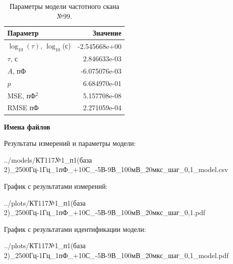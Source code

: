 \begin{table}[!ht]
    \centering
    \caption{Параметры модели частотного скана №99.}
    \begin{tabular}{|l|r|}
        \hline
        Параметр                                       & Значение                  \\ \hline
        $\log_{10}(\tau)$, $\log_{10}$(с)              & -2.545668e+00             \\ \hline
        $\tau$, с                                      & 2.846633e-03              \\ \hline
        $A$, пФ                                        & -6.075076e-03             \\ \hline
        $p$                                            & 6.684970e-01              \\ \hline
        MSE, пФ$^2$                                    & 5.157708e-08              \\ \hline
        RMSE пФ                                        & 2.271059e-04              \\ \hline
    \end{tabular}
    \label{table:frequency_scan_model_99}
\end{table}

\textbf{Имена файлов}

Результаты измерений и параметры модели:

\scriptsize../models/КТ117№1\_п1(база 2)\_2500Гц-1Гц\_1пФ\_+10С\_-5В-9В\_100мВ\_20мкс\_шаг\_0,1\_model.csv
\normalsize

График с результатами измерений:

\scriptsize../plots/КТ117№1\_п1(база 2)\_2500Гц-1Гц\_1пФ\_+10С\_-5В-9В\_100мВ\_20мкс\_шаг\_0,1.pdf
\normalsize

График с результатами идентификации модели:

\scriptsize../plots/КТ117№1\_п1(база 2)\_2500Гц-1Гц\_1пФ\_+10С\_-5В-9В\_100мВ\_20мкс\_шаг\_0,1\_model.pdf
\normalsize

